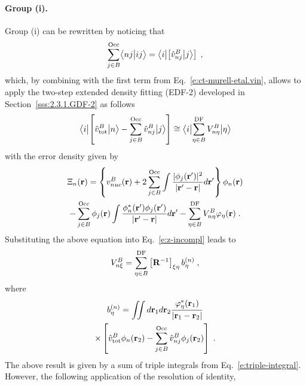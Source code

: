 \paragraph{Group (i).}
Group (i) can be rewritten by noticing that
%
\begin{equation} \label{e:ct-murell-etal.group-i.notice}
 \sum_{j\in B}^{\rm Occ} 
 \BraKet{nj}{ij} =
 \Bra{i} \left[ \hat{v}^B_{nj} \Ket{j} \right]  \;,
\end{equation}
%
which, by combining with the first term from Eq.~\eqref{e:ct-murell-etal.vin}, 
allows to apply the two\hyp{}step extended density fitting (EDF-2) 
developed in Section~\ref{sss:2.3.1.GDF-2} as follows
%
\begin{equation} \label{e:v-oep.ct}
\Bra{i} \left[ \hat{v}^B_{\rm tot} \Ket{n} - \sum_{j\in B}^{\rm Occ} \hat{v}^B_{nj} \Ket{j} \right]
\cong \Bra{i} \sum_{\eta\in B}^{\rm DF} V^B_{n\eta} \Ket{\eta}
\end{equation}
%
with the error density given by
%
\begin{multline}
 \Xi_n({\bf r}) = 
  \left\{
      v_{nuc}^B({\bf r}) + 2 \sum_{j\in B}^{\rm Occ}
   \int \frac{ \vert \phi_j({\bf r}') \vert^2 }{\vert {\bf r}' - {\bf r} \vert} d{\bf r}'
  \right\}
  \phi_n({{\bf r}})  \\
 - \sum_{j\in B}^{\rm Occ} \phi_j({{\bf r}})
   \int \frac{ \phi^*_n({\bf r}') \phi_j({{\bf r}'}) }{\vert {\bf r}' - {\bf r} \vert} d{\bf r}'
 - \sum_{\eta\in B}^{\rm DF} V^B_{n\eta} \varphi_\eta({\bf r}) \;.
\end{multline}
%
Substituting the above equation into Eq.~\eqref{e:z-incompl}
leads to
%
\begin{equation} \label{e:v-oep-group-1-prefinal}
 V^B_{n\xi} = \sum_{\eta\in B}^{\rm DF} \left[ {\bf R}^{-1} \right]_{\xi\eta} b_\eta^{(n)} \;,
\end{equation}
%
where
%
\begin{multline}
 b^{(n)}_\eta = \iint 
           d{\bf r}_1 d{\bf r}_2  
           \frac{ \varphi^*_\eta({\bf r}_1) }
            {\vert {\bf r}_1 - {\bf r}_2 \vert } \\ \times
          \left[ 
           \hat{v}^B_{\rm tot}  \phi_n({\bf r}_2) 
         - \sum_{j\in B}^{\rm Occ} \hat{v}^B_{nj} \phi_j({{\bf r}_2})
           \right]  \;.
\end{multline}
%
The above result is given by a sum of triple integrals from Eq.~\eqref{e:triple-integral}.
However, the following application of the resolution of identity,
